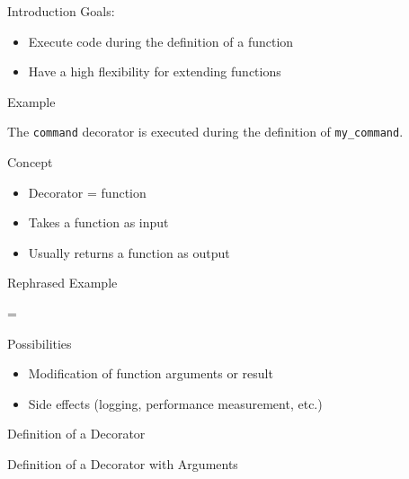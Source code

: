 \begin{frame}{Introduction}
  Goals:
  \begin{itemize}[<+->]
    \item Execute code during the definition of a function
    \item Have a high flexibility for extending functions
  \end{itemize}
\end{frame}

\begin{frame}{Example}

  The \texttt{command} decorator is executed during the definition of
  \texttt{my\_command}.
\end{frame}

\begin{frame}{Concept}
  \begin{itemize}[<+->]
    \item Decorator = function
    \item Takes a function as input
    \item Usually returns a function as output
  \end{itemize}
\end{frame}

\begin{frame}{Rephrased Example}
  \begin{center}
    {\Huge =}
  \end{center}
\end{frame}

\begin{frame}{Possibilities}
  \begin{itemize}[<+->]
    \item Modification of function arguments or result
    \item Side effects (logging, performance measurement, etc.)
  \end{itemize}
\end{frame}

\begin{frame}{Definition of a Decorator}
\end{frame}

\begin{frame}{Definition of a Decorator with Arguments}
\end{frame}

